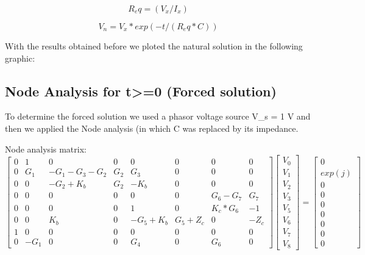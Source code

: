 \begin{equation}

R_eq = (V_x / I_x)

\end{equation}

\begin{equation}

V_n = V_x * exp( -t / (R_eq * C))

\end{equation}

\par
With the results obtained before we ploted the natural solution in the following graphic:



\subsection{Node Analysis for t>=0 (Forced solution)}

To determine the forced solution we used a phasor voltage source V_s = 1 V and then we applied the Node analysis (in which C was replaced by its impedance.

Node analysis matrix:
\begin{equation}
\begin{bmatrix}
  0 & 1 & 0 & 0 & 0 & 0 & 0 & 0 \\
  0 & G_1 & -G_1-G_3-G_2 & G_2 & G_3 & 0 & 0 & 0\\
  0 & 0 & -G_2+K_b & G_2 & -K_b & 0 & 0 & 0 \\
  0 & 0 & 0 & 0 & 0 & 0 & G_6-G_7 & G_7 \\
  0 & 0 & 0 & 0 & 1 & 0 & K_c*G_6 & -1 \\
  0 & 0 & K_b & 0 & -G_5+K_b & G_5+Z_c & 0 & -Z_c \\
  1 & 0 & 0 & 0 & 0 & 0 & 0 & 0 \\
  0 & -G_1 & 0 & 0 & G_4 & 0 & G_6 & 0
\end{bmatrix}
\begin{bmatrix}
  V_0 \\ V_1 \\ V_2 \\ V_3 \\ V_5 \\ V_6 \\ V_7 \\ V_8 
\end{bmatrix}
=
\begin{bmatrix}
  0 \\ exp(j) \\ 0 \\ 0 \\ 0 \\ 0 \\ 0 \\ 0 \\ 0
\end{bmatrix}
\end{equation}

